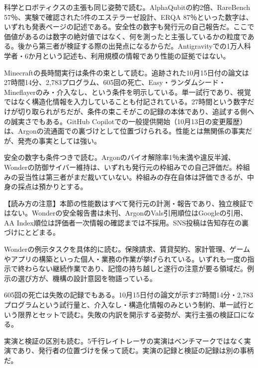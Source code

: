 \documentclass[lualatex,a4paper,10pt]{jlreq}
\begin{document}
科学とロボティクスの主張も同じ姿勢で読む。AlphaQubitの約2倍、RareBench 57％、実験で確認された5件のエステラーゼ設計、ERQA 87％といった数字は、いずれも発表ページの記述である。安全性の数字も発行元の自己報告だ。ここで価値があるのは数字の絶対値ではなく、何を測ったと主張しているかの粒度である。後から第三者が検証する際の出発点になるからだ。Antigravityでの1万人科学者・6か月という記述も、利用規模の情報であり性能の証拠ではない。
\cite{B04,B05,B06,B07,B08}


Minecraftの長時間実行は条件の束として読む。追跡された10月15日付の論文は27時間14分、2,783プログラム、605回の死亡、Easy・ランダムシード・Mineflayerのみ・介入なし、という条件を明示している。単一試行であり、視覚ではなく構造化情報を入力していることも付記されている。27時間という数字だけが切り取られがちだが、条件の束こそがこの記録の本体であり、追試する側への誠実さでもある。GitHub Copilotでの一般提供開始（10月13日の変更履歴）は、Argonの流通面での裏づけとして位置づけられる。性能とは無関係の事実だが、発売の事実としては強い。
\cite{B04,B05,B06,B07,B08}


安全の数字も条件つきで読む。Argonのバイオ解除率1％未満や違反半減、Wonderの防御サイバー維持は、いずれも発行元の枠組みでの自己評価だ。枠組みの妥当性は第三者がまだ裁いていない。枠組みの存在自体は評価できるが、中身の採点は預かりとする。
\cite{B01,B04,B05,B02,B06,B07,B03,B08}


\begin{tcolorbox}[colback=SurveySoft,colframe=SurveyRule,arc=1mm,boxrule=0.4pt,left=2mm,right=2mm]
【読み方の注意】本節の性能数はすべて発行元の計測・報告であり、独立検証ではない。Wonderの安全報告書は未刊、ArgonのVals引用順位はGoogleの引用、AA Index順位は評価者一次情報の確認までは不採用。SNS投稿は告知存在の裏づけにとどまる。
\end{tcolorbox}
\cite{B01,B04,B05,B02,B06,B07,B03,B08}


Wonderの例示タスクを具体的に読む。保険請求、賃貸契約、家計管理、ゲームやアプリの構築といった個人・業務の作業が挙げられている。いずれも一度の指示で終わらない継続作業であり、記憶の持ち越しと遂行の注意が要る領域だ。例示の選び方が、機構の設計意図を物語っている。
\cite{B01,B02,B03}


605回の死亡は失敗の記録でもある。10月15日付の論文が示す27時間14分・2,783プログラムという試行量と、介入なし・構造化情報のみという制約、単一試行という限界とセットで読む。失敗の内訳を開示する姿勢が、実行主張の検証口になる。
\cite{B04,B05,B06,B07,B08}


実演と検証の区別も読む。5千行レイトレーサの実演はベンチマークではなく実演であり、発行者の位置づけを保って読む。実演の記録と検証の記録は別の事柄だ。
\cite{B04,B05,B06,B07,B08}
\end{document}
